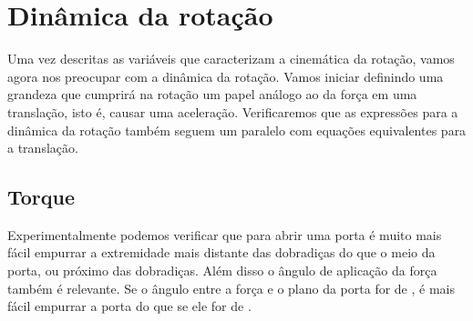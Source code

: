 \section{Dinâmica da rotação}

Uma vez descritas as variáveis que caracterizam a cinemática da rotação, vamos agora nos preocupar com a dinâmica da rotação. Vamos iniciar definindo uma grandeza que cumprirá na rotação um papel análogo ao da força em uma translação, isto é, causar uma aceleração. Verificaremos que as expressões para a dinâmica da rotação também seguem um paralelo com equações equivalentes para a translação.

\subsection{Torque}

Experimentalmente podemos verificar que para abrir uma porta é muito mais fácil empurrar a extremidade mais distante das dobradiças do que o meio da porta, ou próximo das dobradiças. Além disso o ângulo de aplicação da força também é relevante. Se o ângulo entre a força e o plano da porta for de , é mais fácil empurrar a porta do que se ele for de .

